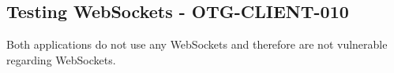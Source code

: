 \subsection{Testing WebSockets - OTG-CLIENT-010}
Both applications do not use any WebSockets and therefore are not vulnerable regarding WebSockets.
\clearpage